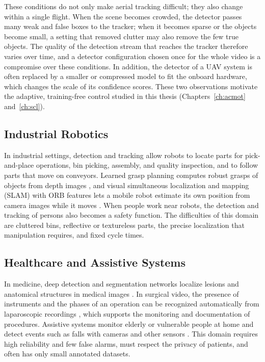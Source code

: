 These conditions do not only make aerial tracking difficult; they also change within a single flight. When the scene becomes crowded, the detector passes many weak and false boxes to the tracker; when it becomes sparse or the objects become small, a setting that removed clutter may also remove the few true objects. The quality of the detection stream that reaches the tracker therefore varies over time, and a detector configuration chosen once for the whole video is a compromise over these conditions. In addition, the detector of a UAV system is often replaced by a smaller or compressed model to fit the onboard hardware, which changes the scale of its confidence scores. These two observations motivate the adaptive, training-free control studied in this thesis (Chapters~\ref{ch:acmot} and~\ref{ch:scl}).

\subsection{Industrial Robotics}\label{sec:bg-app-robot}
In industrial settings, detection and tracking allow robots to locate parts for pick-and-place operations, bin picking, assembly, and quality inspection, and to follow parts that move on conveyors. Learned grasp planning computes robust grasps of objects from depth images \cite{mahler2017dexnet}, and visual simultaneous localization and mapping (SLAM) with ORB features lets a mobile robot estimate its own position from camera images while it moves \cite{murartal2017orbslam2}. When people work near robots, the detection and tracking of persons also becomes a safety function. The difficulties of this domain are cluttered bins, reflective or textureless parts, the precise localization that manipulation requires, and fixed cycle times.

\subsection{Healthcare and Assistive Systems}\label{sec:bg-app-health}
In medicine, deep detection and segmentation networks localize lesions and anatomical structures in medical images \cite{litjens2017survey}. In surgical video, the presence of instruments and the phases of an operation can be recognized automatically from laparoscopic recordings \cite{twinanda2017endonet}, which supports the monitoring and documentation of procedures. Assistive systems monitor elderly or vulnerable people at home and detect events such as falls with cameras and other sensors \cite{mubashir2013fall}. This domain requires high reliability and few false alarms, must respect the privacy of patients, and often has only small annotated datasets.

